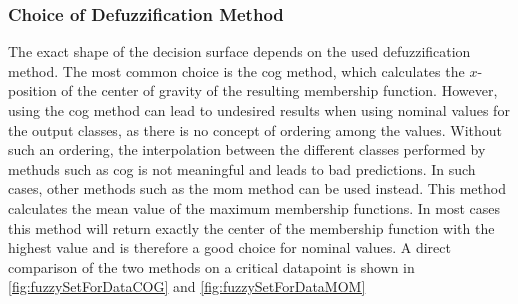 \subsubsection{Choice of Defuzzification Method}

The exact shape of the decision surface depends on the used defuzzification method. The most common choice is the \gls{cog} method, which calculates the $x$-position of the center of gravity of the resulting membership function.
However, using the \gls{cog} method can lead to undesired results when using nominal  values for the output classes, as there is no concept of ordering among the values.
Without such an ordering, the interpolation between the different classes performed by methuds such as \gls{cog} is not meaningful and leads to bad predictions. In such cases, other methods such as the \gls{mom} method can be used instead. This method calculates the mean value of the maximum membership functions. In most cases this method will return exactly the center of the  membership function with the highest value and is therefore a good choice for nominal values. A direct comparison of the two methods on a critical datapoint is shown in \autoref{fig:fuzzySetForDataCOG} and \autoref{fig:fuzzySetForDataMOM}

